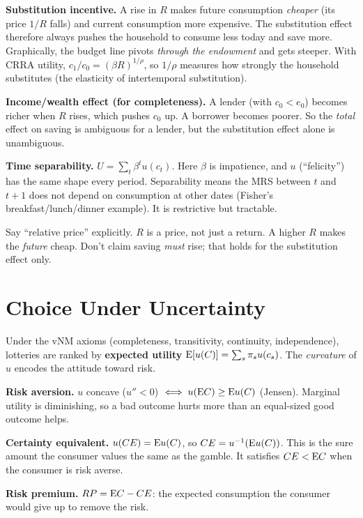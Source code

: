 \documentclass[10pt]{article}
\begin{document}
\textbf{Substitution incentive.} A rise in $R$ makes future consumption \emph{cheaper} (its price $1/R$ falls) and current consumption more expensive. The substitution effect therefore always pushes the household to consume less today and save more. Graphically, the budget line pivots \emph{through the endowment} and gets steeper. With CRRA utility, $c_1/c_0=(\beta R)^{1/\rho}$, so $1/\rho$ measures how strongly the household substitutes (the elasticity of intertemporal substitution).

\textbf{Income/wealth effect (for completeness).} A lender (with $c_0<e_0$) becomes richer when $R$ rises, which pushes $c_0$ up. A borrower becomes poorer. So the \emph{total} effect on saving is ambiguous for a lender, but the substitution effect alone is unambiguous.

\textbf{Time separability.} $U=\sum_t\beta^tu(c_t)$. Here $\beta$ is impatience, and $u$ (``felicity'') has the same shape every period. Separability means the MRS between $t$ and $t+1$ does not depend on consumption at other dates (Fisher's breakfast/lunch/dinner example). It is restrictive but tractable.

\begin{trap}
\small Say ``relative price'' explicitly. $R$ is a price, not just a return. A higher $R$ makes the \emph{future} cheap. Don't claim saving \emph{must} rise; that holds for the substitution effect only.
\end{trap}

\section{Choice Under Uncertainty}

\begin{bigidea}
Under the vNM axioms (completeness, transitivity, continuity, independence), lotteries are ranked by \textbf{expected utility} $\mathrm{E}[u(C)]=\sum_s\pi_su(c_s)$. The \emph{curvature} of $u$ encodes the attitude toward risk.
\end{bigidea}

\begin{minipage}{0.52\textwidth}
\textbf{Risk aversion.} $u$ concave ($u''<0$) $\iff u(\mathrm{E} C)\ge\mathrm{E} u(C)$ (Jensen). Marginal utility is diminishing, so a bad outcome hurts more than an equal-sized good outcome helps.

\textbf{Certainty equivalent.} $u(CE)=\mathrm{E} u(C)$, so $CE=u^{-1}(\mathrm{E} u(C))$. This is the sure amount the consumer values the same as the gamble. It satisfies $CE<\mathrm{E} C$ when the consumer is risk averse.

\textbf{Risk premium.} $RP=\mathrm{E} C-CE$: the expected consumption the consumer would give up to remove the risk.
\end{minipage}\hfill
\begin{minipage}{0.45\textwidth}\centering
\figCE
\end{minipage}
\end{document}
